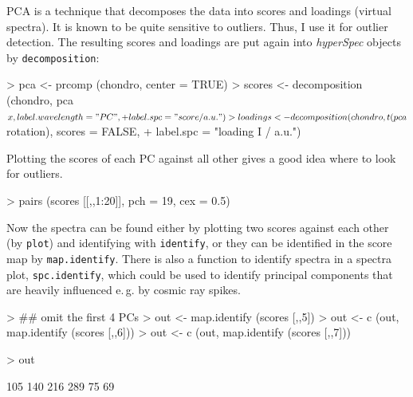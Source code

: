 \documentclass[english, a4paper, 10pt, headings=small, DIV11]{scrartcl}
\renewenvironment{Schunk}{\vspace{0pt}\begin{small}}{\end{small}\vspace{0pt}}
\newcommand{\Rfunction}[2][]{\texorpdfstring{\nohyphens{#1\texttt{#2}}}{#2}}
\newcommand{\Rclass}[1]{\texorpdfstring{\nohyphens{\textit{#1}}}{#1}}
\newcommand{\eg}{e.\,g.\xspace}
\begin{document}
PCA is a technique that decomposes the data into scores and loadings
(virtual spectra). It is known to be quite sensitive to outliers. Thus,
I use it for outlier detection. The resulting scores and loadings
are put again into \Rclass{hyperSpec} objects by \Rfunction{decomposition}:

\begin{Schunk}
\begin{Sinput}
> pca <- prcomp (chondro, center = TRUE)
> scores <- decomposition (chondro, pca$x, label.wavelength = "PC",
+                          label.spc = "score / a.u.")
> loadings <- decomposition (chondro, t(pca$rotation), scores = FALSE,
+                            label.spc = "loading I / a.u.")
\end{Sinput}
\end{Schunk}

Plotting the scores of each PC against all other gives a good idea
where to look for outliers.

\begin{Schunk}
\begin{Sinput}
> pairs (scores [[,,1:20]], pch = 19, cex = 0.5)
\end{Sinput}
\end{Schunk}

Now the spectra can be found either by plotting two scores against
each other (by \Rfunction{plot}) and identifying with \Rfunction{identify},
or they can be identified in the score map by \Rfunction{map.identify}.
There is also a function to identify spectra in a spectra plot, \Rfunction{spc.identify},
which could be used to identify principal components that are heavily influenced \eg by cosmic ray spikes.

\begin{Schunk}
\begin{Sinput}
> ## omit the first 4 PCs
> out <- map.identify (scores [,,5])
> out <- c (out, map.identify (scores [,,6]))
> out <- c (out, map.identify (scores [,,7]))
\end{Sinput}
\end{Schunk}


\begin{Schunk}
\begin{Sinput}
> out
\end{Sinput}
\begin{Soutput}
[1] 105 140 216 289  75  69
\end{Soutput}
\end{Schunk}
\end{document}
